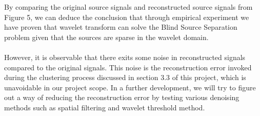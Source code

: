 \documentclass[a4paper,11pt]{article}
\begin{document}
By comparing the original source signals and reconstructed source signals from Figure 5, we can deduce the conclusion that through empirical experiment we have proven that wavelet transform can solve the Blind Source Separation problem given that the sources are sparse in the wavelet domain. \\
\\
\noindent However, it is observable that there exits some noise in reconstructed signals compared to the original signals. This noise is the reconstruction error invoked during the clustering process discussed in section 3.3 of this project, which is unavoidable in our project scope. In a further development, we will try to figure out a way of reducing the reconstruction error by testing various denoising methods such as spatial filtering and wavelet threshold method. 

\pagebreak


\end{document}

